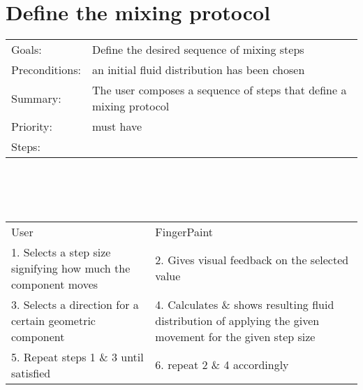 \documentclass[a4paper,twoside,11pt]{article}
\begin{document}
\section*{Define the mixing protocol}
\begin{tabular}{ll}

 Goals: & Define the desired sequence of mixing steps \\
 Preconditions: & an initial fluid distribution has been chosen \\
 Summary: & The user composes a sequence of steps that define a mixing protocol \\
 Priority: & must have \\
 Steps: & \\
\end{tabular} \\
\ \\ \ \\
\begin{tabular}{p{}p{}}
 User                       & FingerPaint                            \\
 1. Selects a step size signifying how much the component moves & 2. Gives visual feedback on the selected value \\
 3. Selects a direction for a certain geometric component & 4. Calculates \& shows resulting fluid distribution of applying the given movement for the given step size \\
 5. Repeat steps 1 \& 3 until satisfied & 6. repeat 2 \& 4 accordingly \\
\end{tabular}
\end{document}
